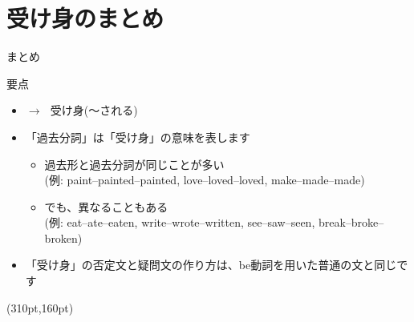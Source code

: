 \documentclass[aspectratio=169,xcolor={dvipsnames,table}]{beamer}
\begin{document}
\section{受け身のまとめ}
\begin{frame}[plain,t]{まとめ}
 
\begin{block}{要点}
\begin{itemize}[square]\small
 \item {} $\longrightarrow$\,\,\,\,受け身(〜される)
 \item 「過去分詞」は「受け身」の意味を表します
        \begin{itemize}
	 \item 過去形と過去分詞が同じことが多い\\
\mbox{}\hfill{}(例: paint--painted--painted, love--loved--loved, make--made--made)
	 \item でも、異なることもある\\
\mbox{}\hfill{}(例: eat--ate--eaten, write--wrote--written, see--saw--seen, break--broke--broken)
	\end{itemize}
 \item 「受け身」の否定文と疑問文の作り方は、be動詞を用いた普通の文と同じです
\end{itemize}
     \end{block}

\begin{textblock*}{0.4\linewidth}(310pt,160pt)
\end{textblock*}

\end{frame}
\end{document}
